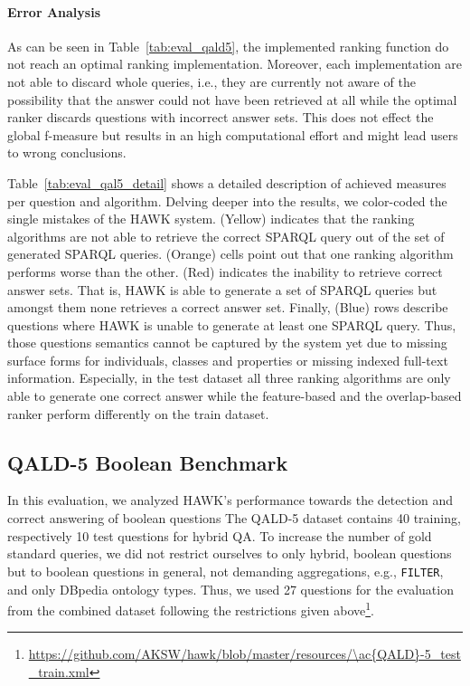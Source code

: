 \paragraph{Error Analysis}
As can be seen in Table~\ref{tab:eval_qald5}, the implemented ranking function do not reach an optimal ranking implementation.
Moreover, each implementation are not able to discard whole queries, i.e., they are currently not aware of the possibility that the answer could not have been retrieved at all while the optimal ranker discards questions with incorrect answer sets. 
This does not effect the global f-measure but results in an high computational effort and might lead users to wrong conclusions. 

Table~\ref{tab:eval_qal5_detail} shows a detailed description of achieved measures per question and algorithm. 
Delving deeper into the results, we color-coded the single mistakes of the HAWK system.
(Yellow) indicates that the ranking algorithms are not able to retrieve the correct SPARQL query out of the set of generated SPARQL queries. 
(Orange) cells point out that one ranking algorithm performs worse than the other. 
(Red) indicates the inability to retrieve correct answer sets.
That is, HAWK is able to generate a set of SPARQL queries but amongst them none retrieves a correct answer set.
Finally, (Blue) rows describe questions where HAWK is unable to generate at least one SPARQL query.
Thus, those questions semantics cannot be captured by the system yet due to missing surface forms for individuals, classes and properties or missing indexed full-text information.
Especially, in the test dataset all three ranking algorithms are only able to generate one correct answer while the feature-based and the overlap-based ranker perform differently on the train dataset.





\subsection{QALD-5 Boolean Benchmark}

In this evaluation, we analyzed HAWK's performance towards the detection and correct answering of boolean questions
The \ac{QALD}-5 dataset contains 40 training, respectively 10 test questions for hybrid \ac{QA}.
To increase the number of gold standard queries, we did not restrict ourselves to only hybrid, boolean questions but to boolean questions in general, not demanding aggregations, e.g., \texttt{FILTER}, and only DBpedia ontology types.
Thus, we used 27 questions for the evaluation from the combined dataset following the restrictions given above\footnote{\url{https://github.com/AKSW/hawk/blob/master/resources/\ac{QALD}-5_test_train.xml}}.


